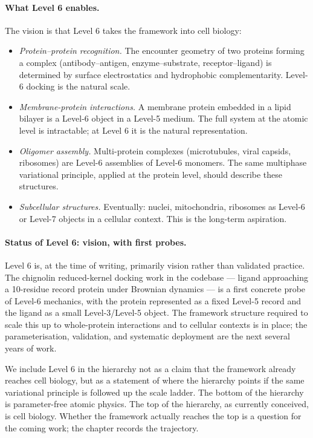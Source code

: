 \paragraph{What Level 6 enables.}
The vision is that Level 6 takes the framework into cell biology:

\begin{itemize}
\item \emph{Protein--protein recognition.} The encounter geometry of two proteins forming a complex (antibody--antigen, enzyme--substrate, receptor--ligand) is determined by surface electrostatics and hydrophobic complementarity. Level-6 docking is the natural scale.
\item \emph{Membrane-protein interactions.} A membrane protein embedded in a lipid bilayer is a Level-6 object in a Level-5 medium. The full system at the atomic level is intractable; at Level 6 it is the natural representation.
\item \emph{Oligomer assembly.} Multi-protein complexes (microtubules, viral capsids, ribosomes) are Level-6 assemblies of Level-6 monomers. The same multiphase variational principle, applied at the protein level, should describe these structures.
\item \emph{Subcellular structures.} Eventually: nuclei, mitochondria, ribosomes as Level-6 or Level-7 objects in a cellular context. This is the long-term aspiration.
\end{itemize}

\paragraph{Status of Level 6: vision, with first probes.}
Level 6 is, at the time of writing, primarily vision rather than validated practice. The chignolin reduced-kernel docking work in the codebase --- ligand approaching a 10-residue record protein under Brownian dynamics --- is a first concrete probe of Level-6 mechanics, with the protein represented as a fixed Level-5 record and the ligand as a small Level-3/Level-5 object. The framework structure required to scale this up to whole-protein interactions and to cellular contexts is in place; the parameterisation, validation, and systematic deployment are the next several years of work.

We include Level 6 in the hierarchy not as a claim that the framework already reaches cell biology, but as a statement of where the hierarchy points if the same variational principle is followed up the scale ladder. The bottom of the hierarchy is parameter-free atomic physics. The top of the hierarchy, as currently conceived, is cell biology. Whether the framework actually reaches the top is a question for the coming work; the chapter records the trajectory.

